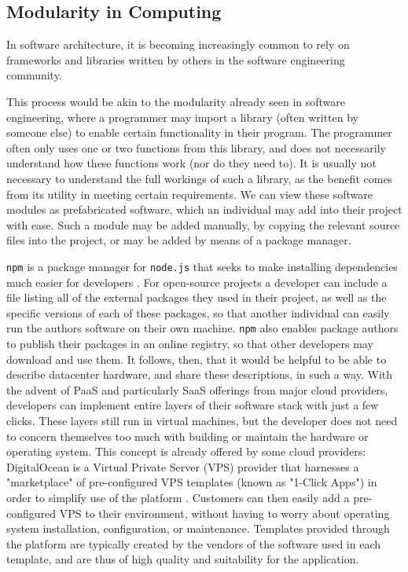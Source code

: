 \documentclass[11pt]{article}
\begin{document}
	
	\subsection{Modularity in Computing}
		In software architecture, it is becoming increasingly common to rely on frameworks and libraries written by others in the software engineering community. 

		This process would be akin to the modularity already seen in software engineering, where a programmer may import a library (often written by someone else) to enable certain functionality in their program. 
		The programmer often only uses one or two functions from this library, and does not necessarily understand how these functions work (nor do they need to).
		It is usually not necessary to understand the full workings of such a library, as the benefit comes from its utility in meeting certain requirements. 
		We can view these software modules as prefabricated software, which an individual may add into their project with ease. 
		Such a module may be added manually, by copying the relevant source files into the project, or may be added by means of a package manager.
		
		\verb|npm| is a package manager for \verb|node.js| that seeks to make installing dependencies much easier for developers \cite{Wittern2016}.
		For open-source projects a developer can include a file listing all of the external packages they used in their project, as well as the specific versions of each of these packages, so that another individual can easily run the authors software on their own machine.
		\verb|npm| also enables package authors to publish their packages in an online registry, so that other developers may download and use them.
		It follows, then, that it would be helpful to be able to describe datacenter hardware, and share these descriptions, in such a way. 
		With the advent of PaaS and particularly SaaS offerings from major cloud providers, developers can implement entire layers of their software stack with just a few clicks. 
		These layers still run in virtual machines, but the developer does not need to concern themselves too much with building or maintain the hardware or operating system.
		This concept is already offered by some cloud providers: DigitalOcean is a Virtual Private Server (VPS) provider that harnesses a "marketplace" of pre-configured VPS templates (known as "1-Click Apps") in order to simplify use of the platform \cite{DigitalOcean2020}. 
		Customers can then easily add a pre-configured VPS to their environment, without having to worry about operating system installation, configuration, or maintenance. 
		Templates provided through the platform are typically created by the vendors of the software used in each template, and are thus of high quality and suitability for the application.
	
\end{document}
